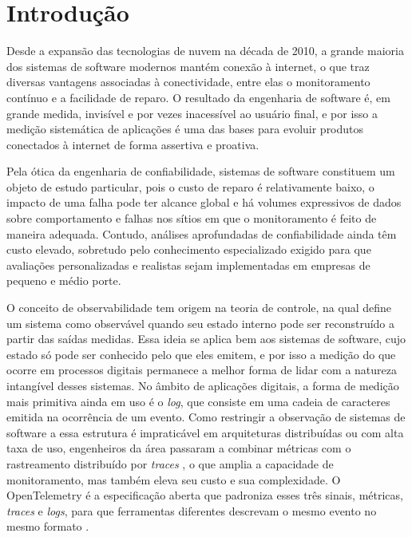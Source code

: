 \documentclass[12pt, a4paper, oneside]{article}
\begin{document}
\vspace{1cm}

\section{Introdução}

Desde a expansão das tecnologias de nuvem na década de 2010, a grande maioria dos sistemas de software modernos mantém conexão à internet, o que traz diversas vantagens associadas à conectividade, entre elas o monitoramento contínuo e a facilidade de reparo. O resultado da engenharia de software é, em grande medida, invisível e por vezes inacessível ao usuário final, e por isso a medição sistemática de aplicações é uma das bases para evoluir produtos conectados à internet de forma assertiva e proativa.

Pela ótica da engenharia de confiabilidade, sistemas de software constituem um objeto de estudo particular, pois o custo de reparo é relativamente baixo, o impacto de uma falha pode ter alcance global e há volumes expressivos de dados sobre comportamento e falhas nos sítios em que o monitoramento é feito de maneira adequada. Contudo, análises aprofundadas de confiabilidade ainda têm custo elevado, sobretudo pelo conhecimento especializado exigido para que avaliações personalizadas e realistas sejam implementadas em empresas de pequeno e médio porte.

O conceito de observabilidade tem origem na teoria de controle, na qual  define um sistema como observável quando seu estado interno pode ser reconstruído a partir das saídas medidas. Essa ideia se aplica bem aos sistemas de software, cujo estado só pode ser conhecido pelo que eles emitem, e por isso a medição do que ocorre em processos digitais permanece a melhor forma de lidar com a natureza intangível desses sistemas. No âmbito de aplicações digitais, a forma de medição mais primitiva ainda em uso é o \textit{log}, que consiste em uma cadeia de caracteres emitida na ocorrência de um evento. Como restringir a observação de sistemas de software a essa estrutura é impraticável em arquiteturas distribuídas ou com alta taxa de uso, engenheiros da área passaram a combinar métricas com o rastreamento distribuído por \textit{traces} \cite{Sigelman2010}, o que amplia a capacidade de monitoramento, mas também eleva seu custo e sua complexidade. O OpenTelemetry é a especificação aberta que padroniza esses três sinais, métricas, \textit{traces} e \textit{logs}, para que ferramentas diferentes descrevam o mesmo evento no mesmo formato \cite{otel_site}.
\end{document}
